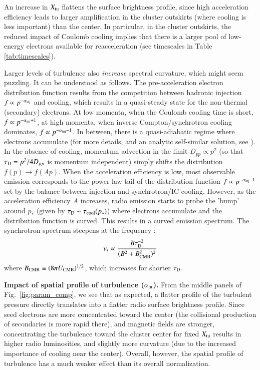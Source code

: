 \documentclass[fleqn,usenatbib,useAMS]{mnras}
\begin{document}
An increase in $X_{\rm tu}$ flattens the surface brightness profile, since high acceleration efficiency leads to larger amplification in the cluster outskirts (where cooling is less important) than the center. In particular, in the cluster outskirts, the reduced impact of Coulomb cooling implies that there is a larger pool of low-energy electrons available for reacceleration (see timescales in Table \ref{tab:timescales}). 

Larger levels of turbulence also {\it increase} spectral curvature, which might seem puzzling. It can be understood as follows. The pre-acceleration electron distribution function results from the competition between hadronic injection $f \propto p^{-\alpha_{\rm inj}}$ and cooling, which results in a quasi-steady state for the non-thermal (secondary) electrons. At low momenta, when the Coulomb cooling time is short, $f \propto p^{-\alpha_{\rm inj}+1}$, at high momenta, when inverse Compton/synchrotron cooling dominates, $f \propto p^{-\alpha_{\rm inj} -1}$. In between, there is a quasi-adiabatic regime where electrons accumulate (for more details, and an analytic self-similar solution, see \citealt{1999ApJ...520..529S, pinzke13}). In the absence of cooling, momentum advection in the limit $D_{pp} \propto p^{2}$ (so that $\tau_{\mathrm{D}} =p^{2}/4 D_{pp}$ is momentum independent) simply shifts the distribution $f(p) \rightarrow f(A p)$. 
When the acceleration efficiency is low, most observable emission corresponds to the power-law tail of the distribution function $f \propto p^{-\alpha_{\rm inj}-1}$ set by the balance between injection and synchrotron/IC cooling. However, as the acceleration efficiency $A$ increases, radio emission starts to probe the 'bump' around $p_{*}$ (given by $\tau_{\rm D} \sim \tau_{\rm cool}(p_{*})$) where electrons accumulate and the distribution function is curved. This results in a curved emission spectrum. The synchrotron spectrum steepens at the frequency \citep{2001MNRAS.320..365B}: 
\begin{equation}
\nu_{\rm s} \propto \frac{B \tau_{\rm D}^{-2}}{(B^{2}+B^{2}_{\rm CMB})^{2}}
\end{equation}
where $B_{\rm CMB} \equiv (8 \pi U_{\rm CMB})^{1/2}$, which increases for shorter $\tau_{\rm D}$.  

{\bf Impact of spatial profile of turbulence ($\alpha_{\rm tu}$).} From the middle panels of Fig.~\ref{fig:param_comp}, we see that as expected, a flatter profile of the turbulent pressure directly translates into a flatter radio surface brightness profile. Since seed electrons are more concentrated toward the center (the collisional production of secondaries is more rapid there), and magnetic fields are stronger, concentrating the turbulence toward the cluster center for fixed $X_{\rm tu}$ results in higher radio luminosities, and slightly more curvature (due to the increased importance of cooling near the center). Overall, however, the spatial profile of turbulence has a much weaker effect than its overall normalization. 
\end{document}
